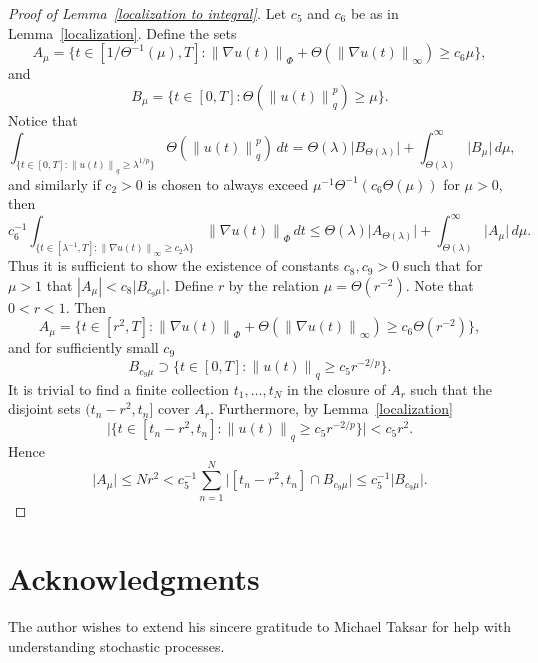 \documentclass[12pt]{amsart}
\theoremstyle{remark}
\newcommand{\modo}[1]{{\left|#1\right|}}
\newcommand{\smodo}[1]{{\mathopen|#1\mathclose|}}
\newcommand{\snormo}[1]{{\mathopen\|#1\mathclose\|}}
\begin{document}
\begin{proof}[Proof of Lemma~\ref{localization to integral}]
Let $c_5$ and $c_6$ be as in Lemma~\ref{localization}.
Define the sets
$$ A_\mu = \{t \in [1/\Theta^{-1}(\mu),T]:
   \snormo{\nabla u(t)}_\Phi + 
   \Theta(\snormo{\nabla u(t)}_\infty) \ge 
   c_6 \mu \} ,$$
and
$$ B_\mu 
   =
   \{t \in [0,T]:
   \Theta(\snormo{u(t)}_q^p) \ge \mu\} .$$
Notice that
$$
   \int_{\{t \in [0,T] \colon
         \snormo{u(t)}_q \ge \lambda^{1/p}\}}
   \Theta(\snormo{u(t)}_q^p) \, dt
   =
   \Theta(\lambda) \smodo{B_{\Theta(\lambda)}}
   +
   \int_{\Theta(\lambda)}^\infty \smodo{B_\mu} \, d\mu ,
$$
and similarly if $c_2>0$ is chosen to always exceed 
$\mu^{-1} \Theta^{-1}(c_6 \Theta(\mu))$ for $\mu > 0$, then
$$
   c_6^{-1} \int_{\{t \in [\lambda^{-1},T] \colon
         \snormo{\nabla u(t)}_\infty \ge c_2 \lambda\}}
   \snormo{\nabla u(t)}_{\Phi} \, dt
   \le 
   \Theta(\lambda) \smodo{A_{\Theta(\lambda)}}
   + 
   \int_{\Theta(\lambda)}^\infty \smodo{A_\mu} \, d\mu .
$$
Thus it is sufficient to show the existence of constants $c_8,c_9>0$ such
that for $\mu > 1$ that $\modo{A_\mu} < c_8 \smodo{B_{c_9\mu}}$.
Define $r$ by the relation $\mu = \Theta(r^{-2})$.  Note that
$0 < r < 1$.  Then
$$ A_\mu = \{t \in [r^2,T]:
   \snormo{\nabla u(t)}_\Phi + 
   \Theta(\snormo{\nabla u(t)}_\infty) \ge 
   c_6 \Theta(r^{-2}) \} ,$$
and for sufficiently small $c_9$
$$ B_{c_9\mu} \supset \{t \in [0,T]:\snormo{u(t)}_q \ge c_5 r^{-2/p}\} .$$
It is trivial to find a finite collection $t_1,\dots,t_N$
in the closure of $A_r$
such that the disjoint sets $(t_n-r^2,t_n]$ cover $A_r$.
Furthermore, by Lemma~\ref{localization}
$$ \smodo{\{t \in [t_n-r^2,t_n] : \snormo{u(t)}_q \ge c_5 r^{-2/p}\}} 
   < c_5 r^2 .$$
Hence
$$ \smodo{A_\mu}
   \le
   N r^2
   <
   c_5^{-1} \sum_{n=1}^N \smodo{[t_n-r^2,t_n] \cap B_{c_9\mu}}
   \le
   c_5^{-1} \smodo{B_{c_9\mu}} .
$$
\end{proof}

\section*{Acknowledgments}

The author wishes to extend his sincere gratitude to Michael Taksar for
help with understanding stochastic processes.
\end{document}
